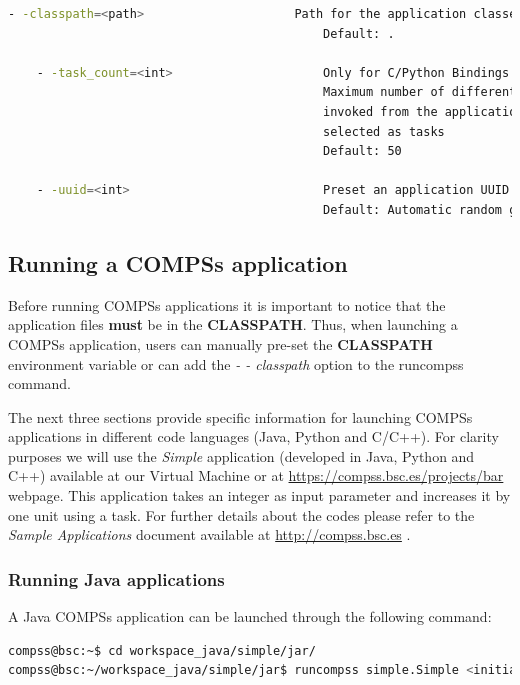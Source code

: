 \begin{lstlisting}[language=bash]
    - -classpath=<path>                     Path for the application classes / modules
                                            Default: .
                                            
    - -task_count=<int>                     Only for C/Python Bindings. 
                                            Maximum number of different functions/methods
                                            invoked from the application that have been 
                                            selected as tasks
                                            Default: 50
                                            
    - -uuid=<int>                           Preset an application UUID
                                            Default: Automatic random generation
\end{lstlisting}

\subsection{Running a COMPSs application}
\label{subsec:running_compss}
Before running COMPSs applications it is important to notice that the application files \textbf{must} be in the \textbf{CLASSPATH}.
Thus, when launching a COMPSs application, users can manually pre-set the \textbf{CLASSPATH} environment variable
or can add the \textit{- - classpath} option to the runcompss command.

The next three sections provide specific information for launching COMPSs applications in different code languages (Java, Python and 
C/C++). For clarity purposes we will use the \textit{Simple} application (developed in Java, Python and C++) available at our
Virtual Machine or at \url{https://compss.bsc.es/projects/bar} webpage. This application takes an integer as input
parameter and increases it by one unit using a task. For further details about the codes please refer to the \textit{Sample 
Applications} document available at \url{http://compss.bsc.es} .

\subsubsection{Running Java applications}
A Java COMPSs application can be launched through the following command:
\begin{lstlisting}[language=bash]
compss@bsc:~$ cd workspace_java/simple/jar/
compss@bsc:~/workspace_java/simple/jar$ runcompss simple.Simple <initial_number>
\end{lstlisting}

